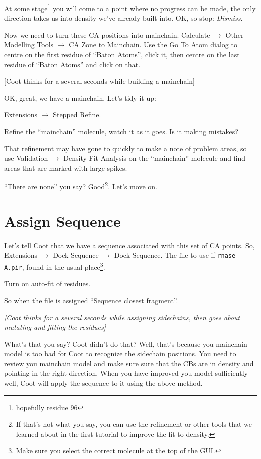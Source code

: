 \documentclass{article}
\begin{document}
At some stage\footnote{hopefully residue 96} you will come to a point
where no progress can be made, the only direction takes us into
density we've already built into.  OK, so stop: \textsl{Dismiss}.

Now we need to turn these CA positions into mainchain.
\textsf{Calculate $\rightarrow$ Other Modelling Tools $\rightarrow$ CA
  Zone to Mainchain}.  Use the \textsf{Go To Atom} dialog to centre on the
first residue of ``Baton Atoms'', click it, then centre on the last
residue of ``Baton Atoms'' and click on that.

\textsf{  [Coot thinks for a several seconds while building a mainchain]}

OK, great, we have a mainchain.  Let's tidy it up:

\textsf{Extensions $\rightarrow$ Stepped Refine}.  

Refine the ``mainchain'' molecule, watch it as it goes.  Is it making
mistakes?

That refinement may have gone to quickly to make a note of problem
areas, so use \textsf{Validation $\rightarrow$ Density Fit Analysis}
on the ``mainchain'' molecule and find areas that are marked with
large spikes.

``There are none'' you say?  Good\footnote{If that's not what you say,
  you can use the refinement or other tools that we learned about in
  the first tutorial to improve the fit to density.}. Let's move on.

\section{Assign Sequence}

Let's tell Coot that we have a sequence associated with this set
of CA points.  So, \textsf{Extensions $\rightarrow$ Dock Sequence
  $\rightarrow$ Dock Sequence}. The file to use if \texttt{rnase-A.pir},
 found in the usual place\footnote{Make sure you select the correct 
molecule at the top of the GUI.}.

Turn on auto-fit of residues.

So when the file is assigned ``Sequence closest fragment''.

\textsl{ [Coot thinks for a several seconds while assigning
  sidechains, then goes about mutating and fitting the residues]}

What's that you say?  Coot didn't do that?  Well, that's because you
mainchain model is too bad for Coot to recognize the sidechain
positions.  You need to review you mainchain model and make sure sure
that the CBs are in density and pointing in the right direction.  When
you have improved you model sufficiently well, Coot will apply the
sequence to it using the above method.
\end{document}
